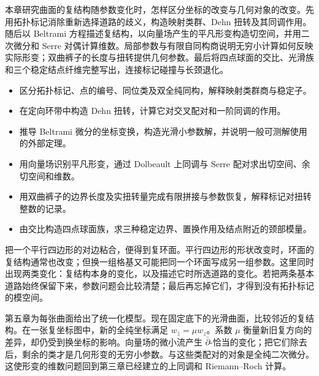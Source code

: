 
% 
% 


\begin{chapterabstract}
本章研究曲面的复结构随参数变化时，怎样区分坐标的改变与几何对象的改变。先用拓扑标记消除重新选择道路的歧义，构造映射类群、Dehn 扭转及其同调作用。随后以 Beltrami 方程描述复结构，以向量场产生的平凡形变构造切空间，并用二次微分和 Serre 对偶计算维数。局部参数与有限自同构商说明无穷小计算如何反映实际形变；双曲裤子的长度与扭转提供几何参数。最后将四点球面的交比、光滑族和三个稳定结点纤维完整写出，连接标记碰撞与长颈退化。
\end{chapterabstract}

\begin{learninggoals}
\begin{itemize}
	\item 区分拓扑标记、点的编号、同位类及双全纯同构，解释映射类群商与稳定子。
	\item 在定向环带中构造 Dehn 扭转，计算它对交叉配对和一阶同调的作用。
	\item 推导 Beltrami 微分的坐标变换，构造光滑小参数解，并说明一般可测解使用的外部定理。
	\item 用向量场识别平凡形变，通过 Dolbeault 上同调与 Serre 配对求出切空间、余切空间和维数。
	\item 用双曲裤子的边界长度及实扭转量完成有限拼接与参数恢复，解释标记对扭转整数的记录。
	\item 由交比构造四点球面族，求三种稳定边界、置换作用及结点附近的颈部模量。
\end{itemize}
\end{learninggoals}

把一个平行四边形的对边粘合，便得到复环面。平行四边形的形状改变时，环面的复结构通常也改变；但换一组格基又可能把同一个环面写成另一组参数。这里同时出现两类变化：复结构本身的变化，以及描述它时所选道路的变化。若把两条基本道路始终保留下来，参数问题会比较清楚；最后再忘掉它们，才得到没有拓扑标记的模空间。

\ProseParagraphBreak

第五章为每张曲面给出了统一化模型。现在固定底下的光滑曲面，比较邻近的复结构。在一张复坐标图中，新的全纯坐标满足 \(w_{\bar z}=\mu w_z\)。系数 \(\mu\) 衡量新旧复方向的差异，却仍受到换坐标的影响。向量场的微小流产生 \(\bar\partial\)-恰当的变化；把它们除去后，剩余的类才是几何形变的无穷小参数。与这些类配对的对象是全纯二次微分。这使形变的维数问题回到第三章已经建立的上同调和 Riemann--Roch 计算。

